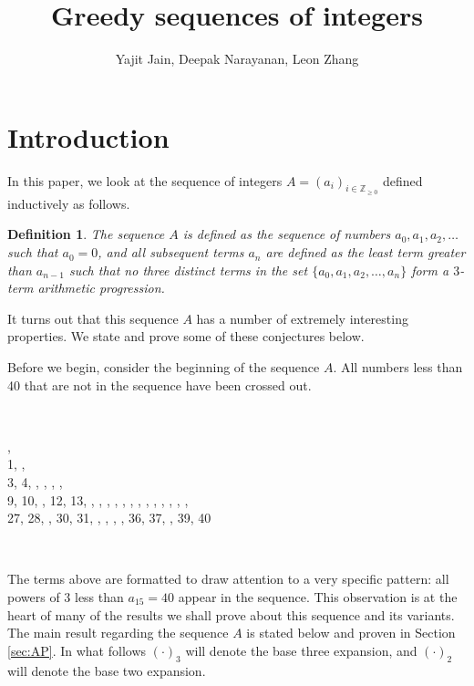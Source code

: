 \documentclass[11pt,letterpaper,twoside,english]{article}
\title{Greedy sequences of integers}
\author{Yajit Jain, Deepak Narayanan, Leon Zhang}
\theoremstyle{theorem}
\newtheorem{definition}[theorem]{Definition}
\theoremstyle{remark}
\begin{document}
\maketitle

\section{Introduction} \label{sec:intro}

In this paper, we look at the sequence of integers $A=(a_i)_{i\in\mathbb{Z}_{\ge 0}}$ defined inductively as follows. 

\begin{definition} \label{def:seqA}
The sequence $A$ is defined as the sequence of numbers $a_0, a_1, a_2, \ldots$ such that $a_0 = 0$, and all subsequent terms $a_{n}$ are defined as the least term greater than $a_{n-1}$ such that no three distinct terms in the set $\{a_0, a_1, a_2, \ldots, a_n\}$ form a $3$-term arithmetic progression.
\end{definition}

It turns out that this sequence $A$ has a number of extremely interesting properties. We state and prove some of these conjectures below.

Before we begin, consider the beginning of the sequence $A$. All numbers less than 40 that are not in the sequence have been crossed out.

\

, 
\\1, ,
\\3, 4, , , , ,
\\9, 10, , 12, 13, , , , , , , , , , , , , ,
\\27, 28, , 30, 31, , , , , 36, 37, , 39, 40

 
 \
 
The terms above are formatted to draw attention to a very specific pattern: all powers of $3$ less than $a_{15}=40$ appear in the sequence. This observation is at the heart of many of the results we shall prove about this sequence and its variants. The main result regarding the sequence $A$ is stated below and proven in Section \ref{sec:AP}. In what follows $(\cdot)_3$ will denote the base three expansion, and $(\cdot)_2$ will denote the base two expansion. 
\end{document}
